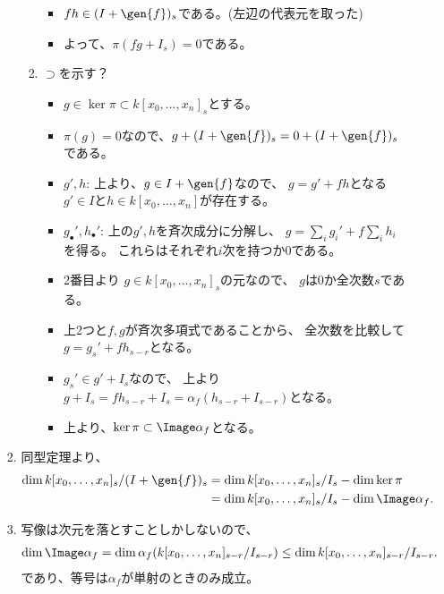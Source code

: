 \begin{myproof}
\begin{enumerate}
\begin{enumerate}
\begin{enumerate}
\begin{enumerate}
\begin{itemize}
            \item $fh \in (I+\gen{f})_s$である。(左辺の代表元を取った)
            \item よって、$\pi(fg+ I_s) = 0$である。
          \end{itemize}
          \item $\supset$を示す？
          \begin{itemize}
            \item $g\in \ker \pi \subset k[x_0,\dots,x_n]_s$とする。
            \item $\pi(g) = 0$なので、$g + (I+\gen{f})_s = 0 + (I+\gen{f})_s$である。
            \item $g',h$: 上より、$g\in I+\gen{f}$なので、
            $g = g' + fh$となる$g'\in I$と$h\in k[x_0,\dots,x_n]$が存在する。
            \item $g_\bullet',h_\bullet'$:
            上の$g',h$を斉次成分に分解し、
            $g= \sum_i g_i' + f \sum_i h_i$を得る。
            これらはそれぞれ$i$次を持つか0である。
            \item 2番目より
            $g\in k[x_0,\dots,x_n]_s$の元なので、
            $g$は0か全次数$s$である。
            \item 上2つと$f,g$が斉次多項式であることから、
            全次数を比較して$g=g_s' + fh_{s-r}$となる。
            \item $g_s' \in g' + I_s$なので、
            上より$g+I_s = fh_{s-r} + I_s = \alpha_f(h_{s-r}+I_{s-r})$となる。
            \item
            上より、$\ker \pi \subset \Image \alpha_f$となる。
          \end{itemize}
        \end{enumerate}
        \item
        同型定理より、
        \begin{align}
          \dim k[x_0,\dots,x_n]_s/(I+\gen{f})_s
          &=
          \dim k[x_0,\dots,x_n]_s/I_s - \dim \ker \pi\\
          &=
          \dim k[x_0,\dots,x_n]_s/I_s - \dim \Image \alpha_f.
        \end{align}
        \item
        写像は次元を落とすことしかしないので、
        \begin{align}
          \dim \Image \alpha_f
          =
          \dim \alpha_f(k[x_0,\dots,x_n]_{s-r}/I_{s-r})
          \le
          \dim k[x_0,\dots,x_n]_{s-r}/I_{s-r}.
        \end{align}
        であり、等号は$\alpha_f$が単射のときのみ成立。

\end{enumerate}
\end{enumerate}
\end{enumerate}
\end{myproof}
